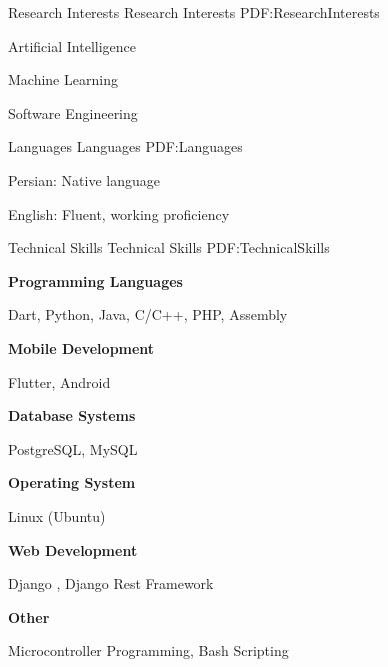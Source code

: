 \documentclass[letterpaper,MMMyyyy,nonstopmode]{simpleresumecv}
\begin{document}
\begin{Body}
\begin{multicols}{2}
\begin{itemize}[leftmargin=*]

\Section
{Research Interests}
{Research Interests}
{PDF:ResearchInterests}

\BulletItem
Artificial Intelligence

\BulletItem
Machine Learning

\BulletItem
Software Engineering

\columnbreak


\Section
{Languages}
{Languages}
{PDF:Languages}

\BulletItem
Persian: Native language

\BulletItem
English: Fluent, working proficiency

\end{itemize}
\end{multicols}


\Section
{Technical Skills}
{Technical Skills}
{PDF:TechnicalSkills}

\begin{multicols}{2}
\begin{itemize}[leftmargin=*]
\BulletItem
\textbf{Programming Languages}
\begin{Detail}
\Item
Dart, Python, Java, C/C++, PHP, Assembly
\end{Detail}

\BulletItem
\textbf{Mobile Development}
\begin{Detail}
\Item
Flutter, Android
\end{Detail}

\BulletItem
\textbf{Database Systems}
\begin{Detail}
\Item
PostgreSQL, MySQL
\end{Detail}

\columnbreak

\BulletItem
\textbf{Operating System}
\begin{Detail}
\Item
Linux (Ubuntu)
\end{Detail}

\BulletItem
\textbf{Web Development}
\begin{Detail}
\Item
Django , Django Rest Framework
\end{Detail}

\BulletItem
\textbf{Other}
\begin{Detail}
\Item
Microcontroller Programming, Bash Scripting
\end{Detail}


\end{itemize}
\end{multicols}
\end{Body}
\end{document}
